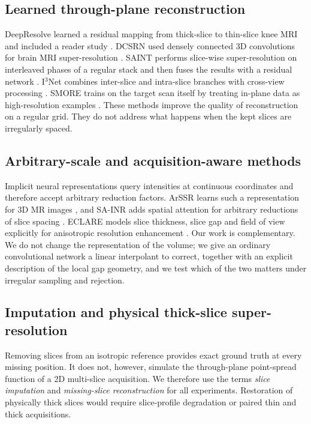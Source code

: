 \documentclass[a4paper,fleqn]{cas-dc}
\newcommand{\Ithree}{I$^3$Net\xspace}
\begin{document}
\subsection{Learned through-plane reconstruction}

DeepResolve learned a residual mapping from thick-slice to thin-slice knee MRI and included a
reader study \citep{chaudhari2018deepresolve}. DCSRN used densely connected 3D convolutions
for brain MRI super-resolution \citep{chen2018dcsrn}. SAINT performs slice-wise
super-resolution on interleaved phases of a regular stack and then fuses the results with a
residual network \citep{peng2020saint}. \Ithree combines inter-slice and intra-slice branches
with cross-view processing \citep{song2024i3net}. SMORE trains on the target scan itself by
treating in-plane data as high-resolution examples \citep{zhao2021smore}. These methods
improve the quality of reconstruction on a regular grid. They do not address what happens
when the kept slices are irregularly spaced.

\subsection{Arbitrary-scale and acquisition-aware methods}

Implicit neural representations query intensities at continuous coordinates and therefore
accept arbitrary reduction factors. ArSSR learns such a representation for 3D MR images
\citep{wu2023arssr}, and SA-INR adds spatial attention for arbitrary reductions of slice
spacing \citep{wang2024sainr}. ECLARE models slice thickness, slice gap and field of view
explicitly for anisotropic resolution enhancement \citep{remedios2026eclare}. Our work is
complementary. We do not change the representation of the volume; we give an ordinary
convolutional network a linear interpolant to correct, together with an explicit
description of the local gap geometry, and we test which of the two matters under irregular
sampling and rejection.

\subsection{Imputation and physical thick-slice super-resolution}

Removing slices from an isotropic reference provides exact ground truth at every missing
position. It does not, however, simulate the through-plane point-spread function of a 2D
multi-slice acquisition. We therefore use the terms \emph{slice imputation} and
\emph{missing-slice reconstruction} for all experiments. Restoration of physically thick
slices would require slice-profile degradation or paired thin and thick acquisitions.
\end{document}
